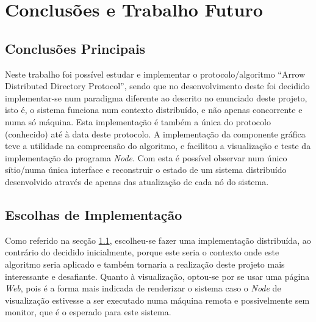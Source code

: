 \chapter{Conclusões e Trabalho Futuro}
\label{chap:conc-trab-futuro}

\section{Conclusões Principais}
\label{sec:conc-princ}

Neste trabalho foi possível estudar e implementar o protocolo/algoritmo ``Arrow Distributed Directory Protocol'', sendo que no desenvolvimento deste foi decidido implementar-se num paradigma diferente ao descrito no enunciado deste projeto, isto é, o sistema funciona num contexto distribuído, e não apenas concorrente e numa só máquina. Esta implementação é também a única do protocolo (conhecido) até à data deste protocolo. 
A implementação da componente gráfica teve a utilidade na compreensão do algoritmo, e facilitou a visualização e teste da implementação do programa \emph{Node}. Com esta é possível observar num único sítio/numa única interface e reconstruir o estado de um sistema distribuído desenvolvido através de apenas das atualização de cada nó do sistema.




\section{Escolhas de Implementação}
\label{sec:escolhas-implementacao}
Como referido na secção \ref{sec:conc-princ}, escolheu-se fazer uma implementação distribuída, ao contrário do decidido inicialmente, porque este seria o contexto onde este algoritmo seria aplicado e também tornaria a realização deste projeto mais interessante e desafiante.
Quanto à visualização, optou-se por se usar uma página \emph{Web}, pois é a forma mais indicada de renderizar o sistema caso o \emph{Node} de visualização estivesse a ser executado numa máquina remota e possivelmente sem monitor, que é o esperado para este sistema.


